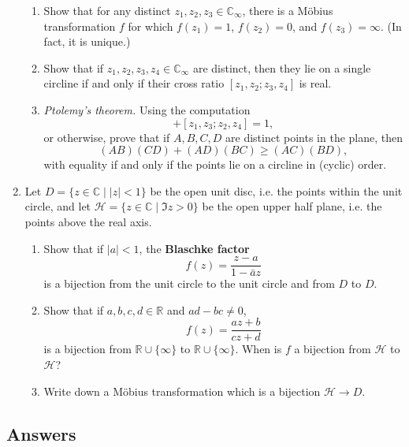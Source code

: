 \begin{enumerate}
\begin{enumerate}
\item Show that for any distinct $z_1,z_2,z_3\in\mathbb{C}_{\infty}$, there is a M\"{o}bius transformation $f$ for which $f(z_1) = 1$, $f(z_2) = 0$, and $f(z_3) = \infty$. (In fact, it is unique.)
\item Show that if $z_1,z_2,z_3,z_4\in\mathbb{C}_{\infty}$ are distinct, then they lie on a single circline if and only if their cross ratio $[z_1,z_2;z_3,z_4]$ is real.
\item \emph{Ptolemy's theorem.} Using the computation
\begin{equation*}
[z_1,z_2;z_3,z_4] + [z_1,z_3;z_2,z_4] = 1,
\end{equation*}
or otherwise, prove that if $A,B,C,D$ are distinct points in the plane, then
\begin{equation*}
(AB)(CD) + (AD)(BC)\geq (AC)(BD),
\end{equation*}
with equality if and only if the points lie on a circline in (cyclic) order.
\end{enumerate}
\item Let $D = \{z\in\mathbb{C}\mid\lvert z\rvert < 1\}$ be the open unit disc, i.e. the points within the unit circle, and let $\mathcal{H} = \{z\in\mathbb{C}\mid\Im z > 0\}$ be the open upper half plane, i.e. the points above the real axis.
\begin{enumerate}
\item Show that if $\lvert a\rvert < 1$, the \textbf{Blaschke factor}
\begin{equation*}
f(z) = \frac{z - a}{1 - \bar{a}z}
\end{equation*}
is a bijection from the unit circle to the unit circle and from $D$ to $D$.
\item Show that if $a,b,c,d\in\mathbb{R}$ and $ad - bc\neq 0$,
\begin{equation*}
f(z) = \frac{az + b}{cz + d}
\end{equation*}
is a bijection from $\mathbb{R}\cup\{\infty\}$ to $\mathbb{R}\cup\{\infty\}$. When is $f$ a bijection from $\mathcal{H}$ to $\mathcal{H}$?
\item Write down a M\"{o}bius transformation which is a bijection $\mathcal{H}\to D$.
\end{enumerate}
\end{enumerate}


\newpage
\subsection{Answers}

